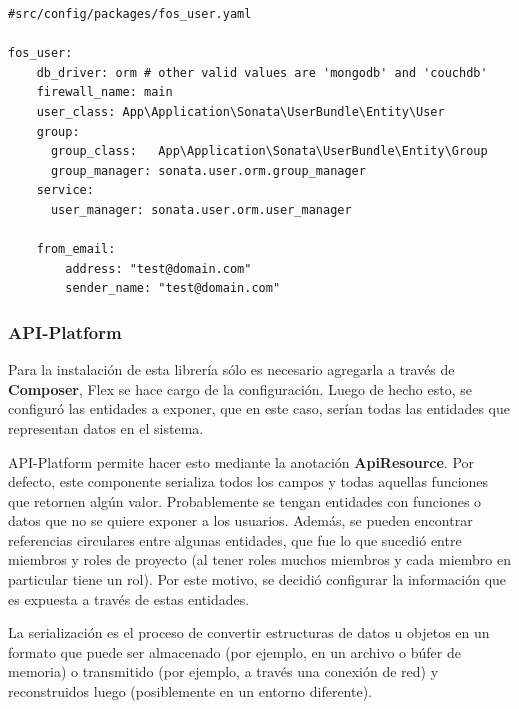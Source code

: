 \newpage
\begin{lstlisting}[caption=Archivo de configuración de FOSUser.\\Fuente: \sonatainstallation]
#src/config/packages/fos_user.yaml

fos_user:
    db_driver: orm # other valid values are 'mongodb' and 'couchdb'
    firewall_name: main
    user_class: App\Application\Sonata\UserBundle\Entity\User
    group:
      group_class:   App\Application\Sonata\UserBundle\Entity\Group
      group_manager: sonata.user.orm.group_manager
    service:
      user_manager: sonata.user.orm.user_manager

    from_email:
        address: "test@domain.com"
        sender_name: "test@domain.com"

\end{lstlisting}

\subsubsection{API-Platform}%
\label{ssub:api_platform}

Para la instalación de esta librería sólo es necesario agregarla a través de \textbf{Composer}, Flex se hace cargo de la configuración\@. Luego de hecho esto,
se configuró las entidades a exponer, que en este caso, serían todas las entidades que representan datos en el sistema.


API-Platform permite hacer esto mediante la anotación \textbf{ApiResource}. Por defecto, este componente serializa todos los campos y todas aquellas funciones
que retornen algún valor\@. Probablemente se tengan entidades con funciones o datos que no se quiere exponer a los usuarios. Además, se pueden encontrar
referencias circulares entre algunas entidades, que fue lo que sucedió entre miembros y roles de proyecto (al tener roles muchos miembros y cada miembro
en particular tiene un rol). Por este motivo, se decidió configurar la información que es expuesta a través de estas entidades.



La serialización es el proceso de convertir estructuras de datos u objetos en un formato que puede ser almacenado (por ejemplo, en un archivo o búfer de memoria)
o transmitido (por ejemplo, a través una conexión de red) y reconstruidos luego (posiblemente en un entorno diferente).~\parencite{serialization}

